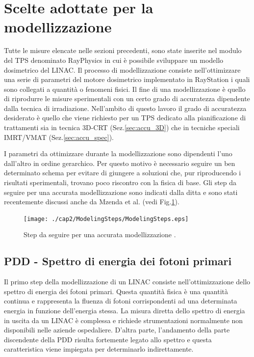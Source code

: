 \section{Scelte adottate per la modellizzazione}
Tutte le misure elencate nelle sezioni precedenti, sono state inserite nel modulo del TPS denominato RayPhysics in cui è possibile sviluppare un modello dosimetrico del LINAC. Il processo di modellizzazione consiste nell'ottimizzare una serie di parametri del motore dosimetrico implementato in RayStation i quali sono collegati a quantità o fenomeni fisici. Il fine di una modellizzazione è quello di riprodurre le misure sperimentali con un certo grado di accuratezza dipendente dalla tecnica di irradiazione. Nell'ambito di questo lavoro il grado di accuratezza desiderato è quello che viene richiesto per un TPS dedicato alla pianificazione di trattamenti sia in tecnica 3D-CRT (Sez.\ref{sec:accu_3D}) che in tecniche speciali IMRT/VMAT (Sez.\ref{sec:accu_spec}).

I parametri da ottimizzare durante la modellizzazione sono dipendenti l'uno dall'altro in ordine gerarchico. Per questo motivo è necessario seguire un ben determinato schema per evitare di giungere a soluzioni che, pur riproducendo i risultati sperimentali, trovano poco riscontro con la fisica di base. Gli step da seguire per una accurata modellizzazione sono indicati dalla ditta \cite{RaySearchLaboratories2014} e sono stati recentemente discussi anche da Mzenda et al.\cite{Mzenda2014} (vedi Fig.\ref{fig:modeling_steps}).
\begin{figure}
\centering
\texttt{[image: ./cap2/ModelingSteps/ModelingSteps.eps]}
\caption{Step da seguire per una accurata modellizzazione \cite{Mzenda2014}.}
\label{fig:modeling_steps}
\end{figure}

\subsection{PDD - Spettro di energia dei fotoni primari}
Il primo step della modellizzazione di un LINAC consiste nell'ottimizzazione dello spettro di energia dei fotoni primari. Questa quantità fisica è una quantità continua e rappresenta la fluenza di fotoni corrispondenti ad una determinata energia in funzione dell'energia stessa. La misura diretta dello spettro di energia in uscita da un LINAC è complessa e richiede strumentazioni normalmente non disponibili nelle aziende ospedaliere. D'altra parte, l'andamento della parte discendente della PDD risulta fortemente legato allo spettro \cite{Khan2010} e questa caratteristica viene impiegata per determinarlo indirettamente.

